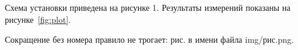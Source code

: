 Схема установки приведена на рисунке 1.
Результаты измерений показаны на рисунке~\ref{fig:plot}.

Сокращение без номера правило не трогает: рис. в имени файла img/рис.png.
